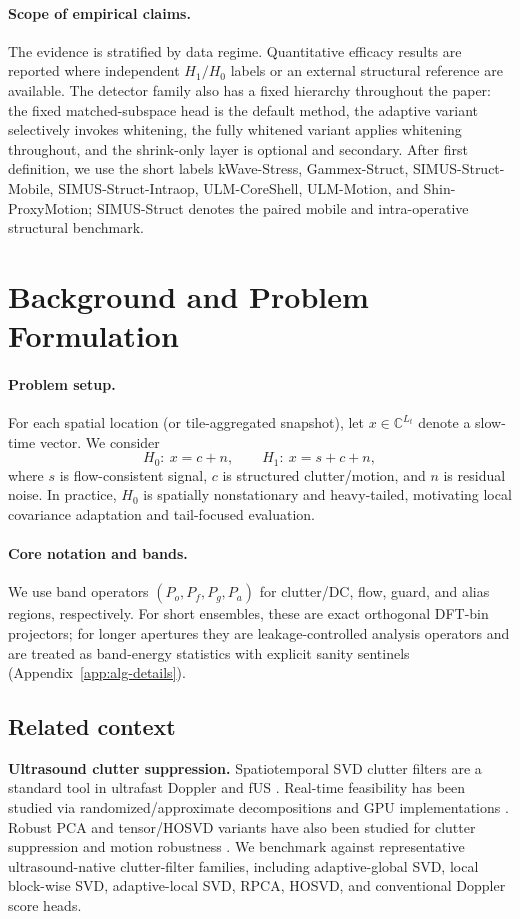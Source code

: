 \documentclass[11pt]{article}
\newcommand{\Pf}{P_f}
\newcommand{\Pa}{P_a}
\newcommand{\Po}{P_o}
\newcommand{\Pg}{P_g}
\newif\ifSTAPPAPERONLY
\newcommand{\SuppOrApp}[1]{\ifSTAPPAPERONLY Supplementary Material\else Appendix~\ref{#1}\fi}
\begin{document}
\paragraph{Scope of empirical claims.}
The evidence is stratified by data regime. Quantitative efficacy results are reported where independent $H_1/H_0$ labels or an external structural reference are available. The detector family also has a fixed hierarchy throughout the paper: the fixed matched-subspace head is the default method, the adaptive variant selectively invokes whitening, the fully whitened variant applies whitening throughout, and the shrink-only layer is optional and secondary. After first definition, we use the short labels kWave-Stress, Gammex-Struct, SIMUS-Struct-Mobile, SIMUS-Struct-Intraop, ULM-CoreShell, ULM-Motion, and Shin-ProxyMotion; SIMUS-Struct denotes the paired mobile and intra-operative structural benchmark.

\section{Background and Problem Formulation}
\label{sec:background-problem}

\paragraph{Problem setup.}
For each spatial location (or tile-aggregated snapshot), let $x\in\mathbb{C}^{L_t}$ denote a slow-time vector. We consider
\[
H_0:\ x=c+n,\qquad H_1:\ x=s+c+n,
\]
where $s$ is flow-consistent signal, $c$ is structured clutter/motion, and $n$ is residual noise. In practice, $H_0$ is spatially nonstationary and heavy-tailed, motivating local covariance adaptation and tail-focused evaluation.

\paragraph{Core notation and bands.}
We use band operators $(\Po,\Pf,\Pg,\Pa)$ for clutter/DC, flow, guard, and alias regions, respectively. For short ensembles, these are exact orthogonal DFT-bin projectors; for longer apertures they are leakage-controlled analysis operators and are treated as band-energy statistics with explicit sanity sentinels (\SuppOrApp{app:alg-details}).

\subsection{Related context}
\textbf{Ultrasound clutter suppression.} Spatiotemporal SVD clutter filters are a standard tool in ultrafast Doppler and fUS \cite{DemeneClutterSVD2015,BarangerAdaptiveSVD2018,Mace2013,Rabut2020,ICDFUS2021}. Real-time feasibility has been studied via randomized/approximate decompositions and GPU implementations \cite{LokRandomizedSVD2020,CheeGPUEigen2017}. Robust PCA and tensor/HOSVD variants have also been studied for clutter suppression and motion robustness \cite{CandesRPCA,SolomonDeepUnfoldedRPCA2020,HuangAdaptiveHOSVD2024}. We benchmark against representative ultrasound-native clutter-filter families, including adaptive-global SVD, local block-wise SVD, adaptive-local SVD, RPCA, HOSVD, and conventional Doppler score heads.
\end{document}
